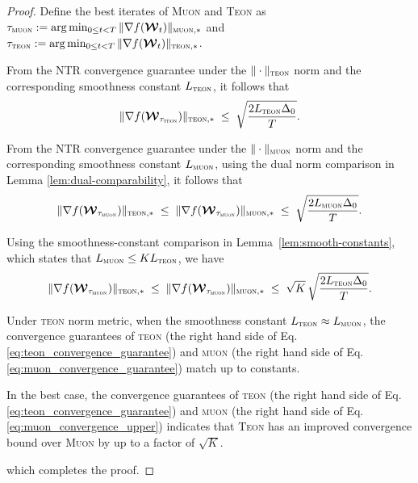 \documentclass{article}
\newcommand{\ten}[1]{\bm{\mathcal{#1}}}
\theoremstyle{plain}
\theoremstyle{definition}
\theoremstyle{remark}
\begin{document}
\begin{proof}
Define the best iterates of \textsc{Muon} and \textsc{Teon} as
$\tau_{\textsc{muon}} := \arg\min_{0\le t < T}\|\nabla f(\ten{W}_t)\|_{\textsc{muon},*}$
and
$\tau_{\textsc{teon}} := \arg\min_{0\le t < T}\|\nabla f(\ten{W}_t)\|_{\textsc{teon},*}$.

From the NTR convergence guarantee under the $\|\cdot\|_{\textsc{teon}}$ norm and
the corresponding smoothness constant $L_{\textsc{teon}}$, it follows that
\begin{equation}
\|\nabla f(\ten{W}_{\tau_{\textsc{teon}}})\|_{\textsc{teon},*}
\;\le\;
\sqrt{\frac{2L_{\textsc{teon}}\Delta_0}{T}} .
\label{eq:teon_convergence_guarantee}
\end{equation}

From the NTR convergence guarantee under the $\|\cdot\|_{\textsc{muon}}$ norm and
the corresponding smoothness constant $L_{\textsc{muon}}$, using the dual norm comparison in Lemma \ref{lem:dual-comparability}, it follows that
\begin{equation}
\|\nabla f(\ten{W}_{\tau_{\textsc{muon}}})\|_{\textsc{teon},*}
\;\le\;
\|\nabla f(\ten{W}_{\tau_{\textsc{muon}}})\|_{\textsc{muon},*}
\;\le\;
\sqrt{\frac{2L_{\textsc{muon}}\Delta_0}{T}} .
\label{eq:muon_convergence_guarantee}
\end{equation}


Using the smoothness-constant comparison in Lemma~\ref{lem:smooth-constants},
which states that $L_{\textsc{muon}}\le K L_{\textsc{teon}}$, we have
\begin{equation}
\|\nabla f(\ten{W}_{\tau_{\textsc{muon}}})\|_{\textsc{teon},*}
\;\le\;
\|\nabla f(\ten{W}_{\tau_{\textsc{muon}}})\|_{\textsc{muon},*}
\;\le\;
\sqrt{K}\,
\sqrt{\frac{2L_{\textsc{teon}}\Delta_0}{T}} .
\label{eq:muon_convergence_upper}
\end{equation}

Under \textsc{teon} norm metric, when the smoothness constant $L_{\textsc{teon}}\approx L_{\textsc{muon}}$, the convergence guarantees of \textsc{teon} (the right hand side of Eq. \eqref{eq:teon_convergence_guarantee}) and \textsc{muon} (the right hand side of Eq. \eqref{eq:muon_convergence_guarantee}) match up to constants. 

In the best case, the convergence guarantees of \textsc{teon} (the right hand side of Eq. \eqref{eq:teon_convergence_guarantee}) and \textsc{muon} (the right hand side of Eq. \eqref{eq:muon_convergence_upper}) indicates that \textsc{Teon} has an improved convergence bound over \textsc{Muon} by up to a factor of $\sqrt{K}$.

which completes the proof.
\end{proof}
\end{document}
